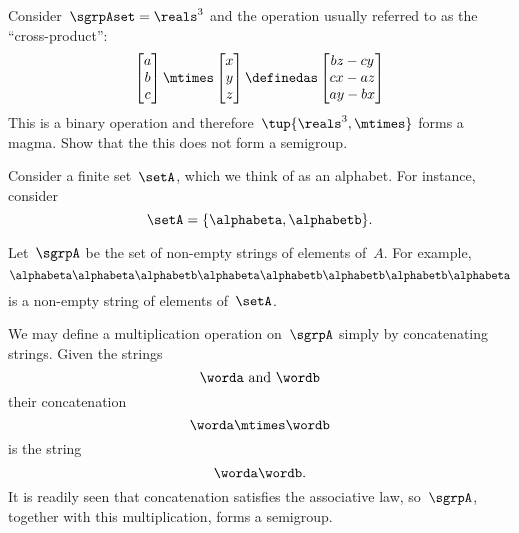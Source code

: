 \begin{exercise}
  \label{ex:cross_prod}
  Consider~$\sgrpAset=\reals^3$ and the operation usually referred to as the ``cross-product'':
  \begin{equation*}
    \begin{bmatrix}
      a\\ b\\ c
    \end{bmatrix}\mtimes \begin{bmatrix}
                           x\\ y \\ z
    \end{bmatrix}\definedas
    \begin{bmatrix}
      bz-cy\\
      cx-az\\
      ay-bx
    \end{bmatrix}
  \end{equation*}
  This is a binary operation and therefore~$\tup{\reals^3,\mtimes}$ forms a magma. Show that the this does not form a semigroup.
\end{exercise}


\begin{example}
  \label{string-sgrp}
  \label{exa:string-semigroup}
  Consider a finite set~$\setA$, which we think of as an alphabet. For instance, consider
  \begin{equation}
    \label{eq:string-semigroup-alphabet}
    \setA = \{ \alphabeta, \alphabetb \}.
  \end{equation}

  Let~$\sgrpA$ be the set of non-empty strings of elements of~$A$. For example,
  \begin{equation}
    \label{eq:string-semigroup-word}
    \alphabeta\alphabeta \alphabetb \alphabeta \alphabetb \alphabetb \alphabetb \alphabeta
  \end{equation}
  is a non-empty string of elements of~$\setA$.

  We may define a multiplication operation on~$\sgrpA$ simply by concatenating strings. Given the strings
  \begin{equation*}
    \worda \text{ and } \wordb
  \end{equation*}
  their concatenation
  \begin{equation*}
    \label{eq:string-semigroup-wordab}
    \worda \mtimes  \wordb
  \end{equation*}
  is the string
  \begin{equation*}
    \label{eq:string-semigroup-wordab-concat}
    \worda \wordb.
  \end{equation*}
  It is readily seen that concatenation satisfies the associative law, so~$\sgrpA$, together with this multiplication, forms a semigroup.
\end{example}
\devel{
  \begin{forslides}
    \begin{equation}
      \label{eq:string-semigroup-empty-string}
      \alphabeta\alphabeta \alphabetb \mtimes \tup{} =  \alphabeta\alphabeta \alphabetb
    \end{equation}
  \end{forslides}
}


